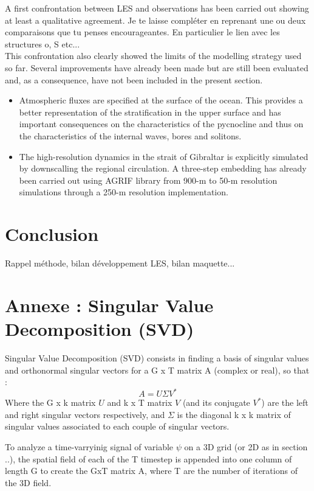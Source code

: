 A first confrontation between LES and observations has been carried out showing at least a qualitative agreement.  \color{green}Je te laisse compléter en reprenant une ou deux comparaisons que tu penses encourageantes. En particulier le lien avec les structures o, S etc...\\
\color{blue}This confrontation also clearly showed the limits of the modelling strategy used so far. Several improvements have already been made but are still been evaluated and, as a consequence, have not been included in the present section. 
\begin{itemize}
\item Atmospheric fluxes are specified at the surface of the ocean.  This provides a better representation of the stratification in the upper surface and has important consequences on the characteristics of the pycnocline and thus on the characteristics of the internal waves, bores and solitons.
\item The high-resolution dynamics in the strait of Gibraltar is explicitly simulated by downscalling the regional circulation. A three-step embedding has already been carried out using AGRIF library from 900-m to 50-m resolution simulations through a 250-m resolution implementation.
\end{itemize}
 \color{black}
\color{black}

\section{Conclusion}

\color{green} Rappel méthode, bilan développement LES, bilan maquette...\color{black}




\section{Annexe : Singular Value Decomposition (SVD)}
Singular Value Decomposition (SVD) consists in finding a basis of singular values and orthonormal singular vectors for a G x T matrix A (complex or real), so that :
\begin{equation}
A = U \Sigma V^* 
\end{equation}
Where the G x k matrix $U$ and k x T matrix $V$ (and its conjugate $V^*$) are the left and right singular vectors respectively, and $\Sigma$ is the diagonal k x k matrix of singular values associated to each couple of singular vectors.

To analyze a time-varryinig signal of variable $\psi$ on a 3D grid (or 2D as in section ..), the spatial field of each of the T timestep is appended into one column of length G to create the GxT matrix A, where T are the number of iterations of the 3D field. 

